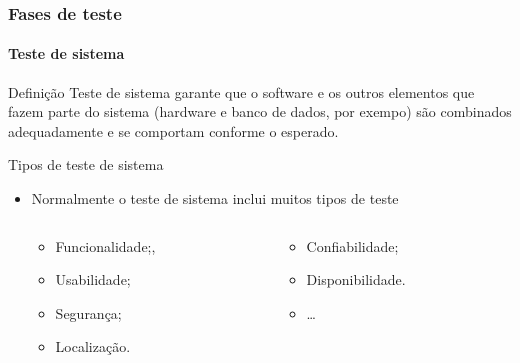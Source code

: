 \begin{frame}
\label{concept:system-testing}
\frametitle{Fases de teste}
\framesubtitle{Teste de sistema}

\begin{block:concept}{Definição}
Teste de sistema garante que o software e os outros elementos que fazem parte do sistema (hardware e banco de dados, por exempo) são combinados adequadamente e se comportam conforme o esperado.
\end{block:concept}

\begin{block:fact}{Tipos de teste de sistema}
\begin{itemize}
	\item Normalmente o teste de sistema inclui muitos tipos de teste
	\begin{columns}[t, totalwidth=6.5cm]
		\begin{column}[t]{3cm}
			\begin{itemize}
				\item Funcionalidade;,
				\item Usabilidade;
				\item Segurança;
				\item Localização.
			\end{itemize}
		\end{column}

		\begin{column}[t]{3cm}
			\begin{itemize}
				\item Confiabilidade;
				\item Disponibilidade.
				\item \ldots
			\end{itemize}
		\end{column}
	\end{columns}
\end{itemize}
\end{block:fact}

\hfill
{}
\end{frame}



